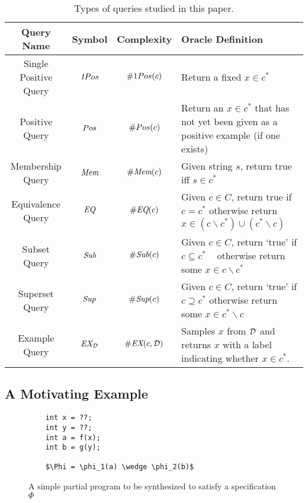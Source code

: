 \begin{table}
\label{table:queries}
\begin{center}
  \begin{tabularx}{\textwidth}{| c | c | c | X | }
    \hline
    Query Name & Symbol & Complexity & Oracle Definition \\ \hline
    Single Positive Query & $\emph{1}Pos$ & $\oneposC(c)$ & Return a fixed $x \in c^*$ \\ \hline
    Positive Query & $Pos$ & $\#Pos(c)$ & Return an $x\in c^*$ that has not yet been given as a positive example (if one exists)\\ \hline
    Membership Query & $\emph{Mem}$ & $\#\emph{Mem}(c)$ & Given string $s$, return true iff $s \in c^*$ \\ \hline
    Equivalence Query & $\emph{EQ}$ & $\#\emph{EQ}(c)$ & Given $c \in C$, return true if $c=c^*$ otherwise return $x \in (c \backslash c^*) \cup (c^* \backslash c)$\\ \hline 
    Subset Query & $\emph{Sub}$ & $\#\emph{Sub}(c)$ & Given $c \in C$, return `true' if $c \subseteq c^*$ \mbox{  } otherwise return some $x \in c \backslash c^*$ \\ \hline
    Superset Query & $\emph{Sup}$ & $\#\emph{Sup}(c)$ & Given $c \in C$, return `true' if $c \supseteq c^*$  otherwise return some $x \in c^* \backslash c$\\ \hline
    Example Query & $\emph{EX}_{\mathcal{D}}$ & $\#\emph{EX}(c, \mathcal{D})$ & Samples $x$ from $\mathcal{D}$ and returns $x$ with a label indicating whether $x \in c^*$. \\ \hline
  \end{tabularx}
\end{center}
\caption{Types of queries studied in this paper.}
\end{table}

\subsection{A Motivating Example}

\begin{figure}
\centering
\begin{varwidth}{\linewidth}
\begin{lstlisting}
    int x = ??;
    int y = ??;
    int a = f(x);
    int b = g(y);
    
    $\Phi = \phi_1(a) \wedge \phi_2(b)$
\end{lstlisting}
\end{varwidth}


\caption{A simple partial program to be synthesized to satisfy a specification $\Phi$}
\label{sketch}
\end{figure}


